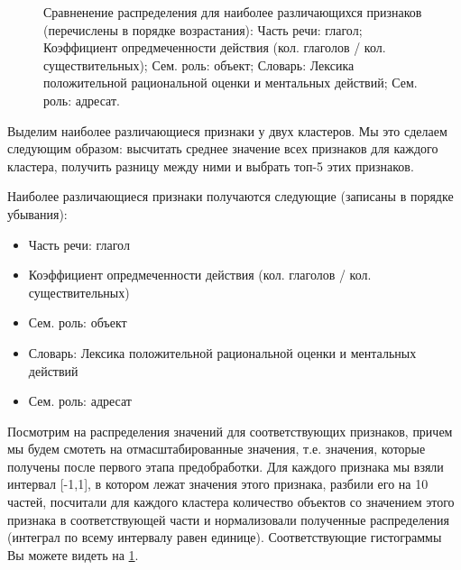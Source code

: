 \documentclass[12pt]{article}
\begin{document}
\begin{figure}[ht!]
\vspace{1ex}
\caption{Сравненение распределения для наиболее различающихся признаков (перечислены в порядке возрастания): 
 Часть речи: глагол; 
 Коэффициент опредмеченности действия (кол. глаголов / кол. существительных); 
 Сем. роль: объект; 
 Словарь: Лексика положительной рациональной оценки и ментальных действий; 
 Сем. роль: адресат.} \label{hist1}
\end{figure}

Выделим наиболее различающиеся признаки у двух кластеров. Мы это сделаем следующим образом: высчитать среднее значение всех признаков для каждого кластера, получить разницу между ними и выбрать топ-5 этих признаков.

Наиболее различающиеся признаки получаются следующие (записаны в порядке убывания):

\begin{itemize}
\item Часть речи: глагол
\item Коэффициент опредмеченности действия (кол. глаголов / кол. существительных)
\item Сем. роль: объект
\item Словарь: Лексика положительной рациональной оценки и ментальных действий
\item Сем. роль: адресат
\end{itemize}


Посмотрим на распределения значений для соответствующих признаков, причем мы будем смотеть на отмасштабированные значения, т.е. значения, которые получены после первого этапа предобработки. Для каждого признака мы взяли интервал [-1,1], в котором лежат значения этого признака, разбили его на 10 частей, посчитали для каждого кластера количество объектов со значением этого признака в соответствующей части и нормализовали полученные распределения (интеграл по всему интервалу равен единице). Соответствующие гистограммы Вы можете видеть на \ref{hist1}.
\end{document}
